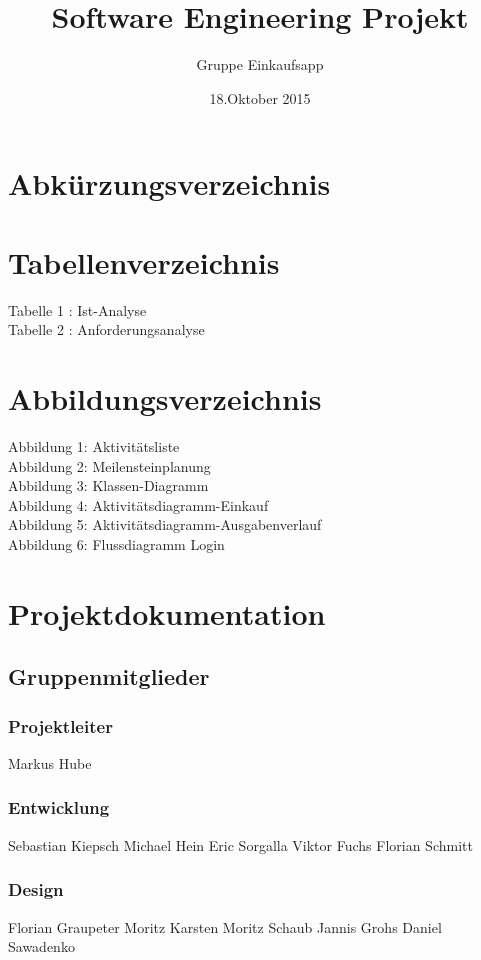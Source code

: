 \documentclass[12pt,a4paper]{article}
\begin{document}
\title{Software Engineering Projekt}
\author{Gruppe Einkaufsapp}
\date {18.Oktober 2015}
\maketitle
\newpage
\tableofcontents
\newpage
\newpage
\section*{Abkürzungsverzeichnis}
\newpage
\section*{Tabellenverzeichnis}
Tabelle 1 : Ist-Analyse
\\
Tabelle 2 : Anforderungsanalyse
\newpage
\section*{Abbildungsverzeichnis}
Abbildung 1: Aktivitätsliste
\\
Abbildung 2: Meilensteinplanung
\\
Abbildung 3: Klassen-Diagramm
\\
Abbildung 4: Aktivitätsdiagramm-Einkauf
\\
Abbildung 5: Aktivitätsdiagramm-Ausgabenverlauf
\\
Abbildung 6: Flussdiagramm Login

\newpage
\section*{Projektdokumentation}
\subsection*{Gruppenmitglieder}
\subsubsection*{Projektleiter}
Markus Hube
\subsubsection*{Entwicklung}
Sebastian Kiepsch
\newline
Michael Hein
\newline
Eric Sorgalla
\newline
Viktor Fuchs
\newline
Florian Schmitt 
\subsubsection*{Design}
Florian Graupeter
\newline
Moritz Karsten
\newline
Moritz Schaub
\newline
Jannis Grohs
\newline
Daniel Sawadenko 
\end{document}
